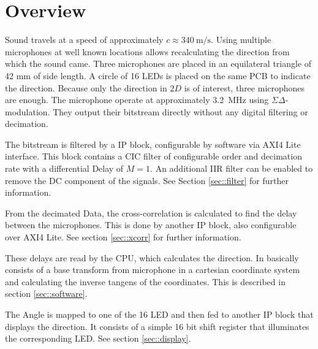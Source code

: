 \section{Overview}
Sound travels at a speed of approximately $c\approx \SI{340}{\meter\per\s}$.
Using multiple microphones at well known locations allows recalculating the direction from which the sound came.
Three microphones are placed in an equilateral triangle of 42 mm of side length.
A circle of 16 LEDs is placed on the same PCB to indicate the direction.
Because only the direction in $2D$ is of interest, three microphones are enough.
The microphone operate at approximately \SI{3.2}{\mega\hertz} using $\Sigma\Delta$-modulation.
They output their bitstream directly without any digital filtering or decimation.

The bitstream is filtered by a IP block, configurable by software via AXI4 Lite interface.
This block contains a CIC filter of configurable order and decimation rate with a differential Delay of $M=1$.
An additional IIR filter can be enabled to remove the DC component of the signals.
See Section \ref{sec::filter} for further information.

From the decimated Data, the cross-correlation is calculated to find the delay between the microphones.
This is done by another IP block, also configurable over AXI4 Lite.
See section \ref{sec::xcorr} for further information.

These delays are read by the CPU, which calculates the direction. 
In basically consists of a base transform from microphone in a cartesian coordinate system and calculating the inverse tangens of the coordinates.
This is described in section \ref{sec::software}.

The Angle is mapped to one of the 16 LED and then fed to another IP block that displays the direction.
It consists of a simple 16 bit shift register that illuminates the corresponding LED.
See section \ref{sec::display}.

